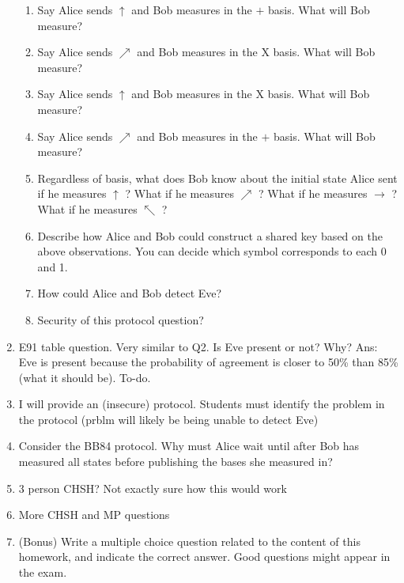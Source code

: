 \documentclass[12pt]{article}
\begin{document}
\begin{enumerate}[font=\bfseries]
        \begin{enumerate}
            \item Say Alice sends $\uparrow$ and Bob measures in the $+$ basis. What will Bob measure?
            \item Say Alice sends $\nearrow$ and Bob measures in the X basis. What will Bob measure?
            \item Say Alice sends $\uparrow$ and Bob measures in the X basis. What will Bob measure?
            \item Say Alice sends $\nearrow$ and Bob measures in the $+$ basis. What will Bob measure?
            \item Regardless of basis, what does Bob know about the initial state Alice sent if he measures $\uparrow$ ? What if he measures $\nearrow$ ? What if he measures  $\rightarrow$ ? What if he measures $\nwarrow$ ?
            \item Describe how Alice and Bob could construct a shared key based on the above observations. You can decide which symbol corresponds to each 0 and 1. 
            \item How could Alice and Bob detect Eve?
            \item Security of this protocol question?
        \end{enumerate}
    \item E91 table question. Very similar to Q2. Is Eve present or not? Why? Ans: Eve is present because the probability of agreement is closer to 50\% than 85\% (what it should be). To-do.
    \item I will provide an (insecure) protocol. Students must identify the problem in the protocol (prblm will likely be being unable to detect Eve)
    \item Consider the BB84 protocol. Why must Alice wait until after Bob has measured all states before publishing the bases she measured in?
    \item 3 person CHSH? Not exactly sure how this would work
    \item More CHSH and MP questions
    \item (Bonus) Write a multiple choice question related to the content of this homework, and indicate the correct answer. Good questions might appear in the exam.
\end{enumerate}
\end{document}
